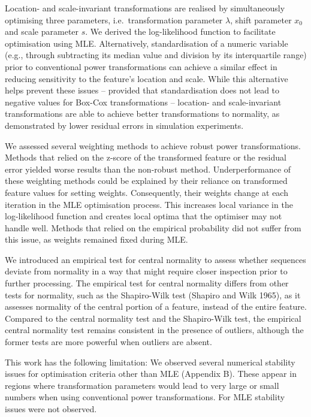 \documentclass[
  a4paper,
]{article}
\begin{document}
Location- and scale-invariant transformations are realised by
simultaneously optimising three parameters, i.e.~transformation
parameter \(\lambda\), shift parameter \(x_0\) and scale parameter
\(s\). We derived the log-likelihood function to facilitate optimisation
using MLE. Alternatively, standardisation of a numeric variable (e.g.,
through subtracting its median value and division by its interquartile
range) prior to conventional power transformations can achieve a similar
effect in reducing sensitivity to the feature's location and scale.
While this alternative helps prevent these issues -- provided that
standardisation does not lead to negative values for Box-Cox
transformations -- location- and scale-invariant transformations are
able to achieve better transformations to normality, as demonstrated by
lower residual errors in simulation experiments.

We assessed several weighting methods to achieve robust power
transformations. Methods that relied on the z-score of the transformed
feature or the residual error yielded worse results than the non-robust
method. Underperformance of these weighting methods could be explained
by their reliance on transformed feature values for setting weights.
Consequently, their weights change at each iteration in the MLE
optimisation process. This increases local variance in the
log-likelihood function and creates local optima that the optimiser may
not handle well. Methods that relied on the empirical probability did
not suffer from this issue, as weights remained fixed during MLE.

We introduced an empirical test for central normality to assess whether
sequences deviate from normality in a way that might require closer
inspection prior to further processing. The empirical test for central
normality differs from other tests for normality, such as the
Shapiro-Wilk test (Shapiro and Wilk 1965), as it assesses normality of
the central portion of a feature, instead of the entire feature.
Compared to the central normality test and the Shapiro-Wilk test, the
empirical central normality test remains consistent in the presence of
outliers, although the former tests are more powerful when outliers are
absent.

This work has the following limitation: We observed several numerical
stability issues for optimisation criteria other than MLE (Appendix B).
These appear in regions where transformation parameters would lead to
very large or small numbers when using conventional power
transformations. For MLE stability issues were not observed.
\end{document}

